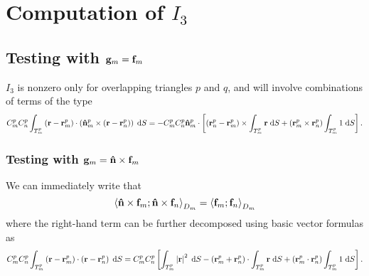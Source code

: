 \section{Computation of $I_3$}

\subsection{Testing with $\mathbf{g}_m = \mathbf{f}_m$}
%
\par
$I_3$ is nonzero only for overlapping triangles $p$ and $q$, and will involve combinations of terms of the type
\begin{equation} \label{eqn:MMPIE_J_RWG_testing_diag_term}
C_m^p C_n^p \int_{T_m^p} \left(\mathbf{r}-\mathbf{r}_m^p\right) \cdot \left(\mathbf{\Hat{n}}_m^p \times \left(\mathbf{r}-\mathbf{r}_n^p\right) \right) \; \text{d} S =  - C_m^p C_n^p \mathbf{\Hat{n}}_m^p \cdot \left[\left(\mathbf{r}_n^p-\mathbf{r}_m^p\right) \times \int_{T_m^p} \mathbf{r} \; \text{d} S + \left(\mathbf{r}_m^p \times \mathbf{r}_n^p\right) \int_{T_m^p} 1 \; \text{d} S \right].
\end{equation}

\subsubsection{Testing with $\mathbf{g}_m = \mathbf{\Hat{n}} \times \mathbf{f}_m$}
%
\par
We can immediately write that
\begin{equation}
\left\langle \mathbf{\Hat{n}} \times \mathbf{f}_m ; \mathbf{\Hat{n}} \times \mathbf{f}_n \right\rangle_{D_m} = \left\langle \mathbf{f}_m ; \mathbf{f}_n \right\rangle_{D_m} 
\end{equation}
where the right-hand term can be further decomposed using basic vector formulas as
\begin{equation} \label{eqn:MMPIE_J_n_x_RWG_testing_diag_term}
C_m^p C_n^p \int_{T_m^p} \left(\mathbf{r}-\mathbf{r}_m^p \right) \cdot \left(\mathbf{r}-\mathbf{r}_n^p\right) \; \text{d} S = C_m^p C_n^p \left[ \int_{T_m^p} \left|\mathbf{r}\right|^2 \; \text{d} S - \left(\mathbf{r}_m^p + \mathbf{r}_n^p \right) \cdot \int_{T_m^p} \mathbf{r} \; \text{d} S + \left(\mathbf{r}_m^p \cdot \mathbf{r}_n^p \right) \int_{T_m^p} 1 \; \text{d} S\right].
\end{equation}



